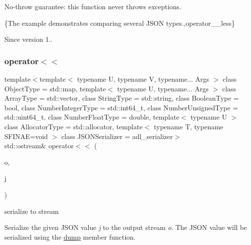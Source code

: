 No-\/throw guarantee\+: this function never throws exceptions.

\{The example demonstrates comparing several J\+S\+ON types.,operator\+\_\+\+\_\+less\}

\begin{DoxySince}{Since}
version 1.. 
\end{DoxySince}
\mbox{\label{classnlohmann_1_1basic__json_a5e34c5435e557d0bf666bd7311211405}} 
\subsubsection{\texorpdfstring{operator$<$$<$}{operator<<}\hspace{0.1cm}{\footnotesize\ttfamily [1/2]}}
{\footnotesize\ttfamily template$<$template$<$ typename U, typename V, typename... Args $>$ class Object\+Type = std\+::map, template$<$ typename U, typename... Args $>$ class Array\+Type = std\+::vector, class String\+Type  = std\+::string, class Boolean\+Type  = bool, class Number\+Integer\+Type  = std\+::int64\+\_\+t, class Number\+Unsigned\+Type  = std\+::uint64\+\_\+t, class Number\+Float\+Type  = double, template$<$ typename U $>$ class Allocator\+Type = std\+::allocator, template$<$ typename T, typename S\+F\+I\+N\+A\+E=void $>$ class J\+S\+O\+N\+Serializer = adl\+\_\+serializer$>$ \\
std\+::ostream\& operator$<$$<$ (\begin{DoxyParamCaption}\item[{std\+::ostream \&}]{o,  }\item[{const \mbox{\hyperlink{classnlohmann_1_1basic__json}{basic\+\_\+json}}$<$ Object\+Type, Array\+Type, String\+Type, Boolean\+Type, Number\+Integer\+Type, Number\+Unsigned\+Type, Number\+Float\+Type, Allocator\+Type, J\+S\+O\+N\+Serializer $>$ \&}]{j }\end{DoxyParamCaption})\hspace{0.3cm}{\ttfamily [friend]}}



serialize to stream 

Serialize the given J\+S\+ON value {\itshape j} to the output stream {\itshape o}. The J\+S\+ON value will be serialized using the \mbox{\hyperlink{classnlohmann_1_1basic__json_a50ec80b02d0f3f51130d4abb5d1cfdc5}{dump}} member function.


